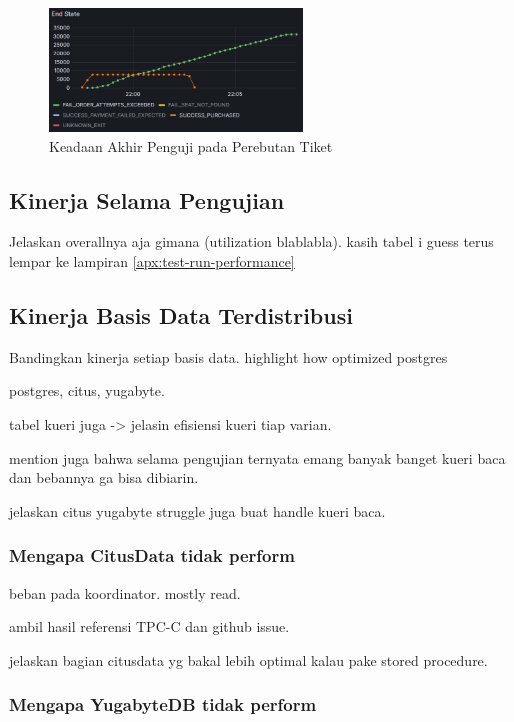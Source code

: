 \begin{figure}[htbp]
    \centering
    \includegraphics[width=0.6\textwidth]{resources/chapter-4/pattern-sim-k6.png}
    \caption{Keadaan Akhir Penguji pada Perebutan Tiket}
    \label{fig:pattern-sim-k6}
\end{figure}


\subsection{Kinerja Selama Pengujian}

Jelaskan overallnya aja gimana (utilization blablabla). kasih tabel i guess terus lempar ke lampiran \ref{apx:test-run-performance}

\subsection{Kinerja Basis Data Terdistribusi}

Bandingkan kinerja setiap basis data. highlight how optimized postgres

postgres, citus, yugabyte.

tabel kueri juga -> jelasin efisiensi kueri tiap varian.

mention juga bahwa selama pengujian ternyata emang banyak banget kueri baca dan bebannya ga bisa dibiarin.

jelaskan citus yugabyte struggle juga buat handle kueri baca.

\subsubsection{Mengapa CitusData tidak perform}

beban pada koordinator. mostly read.

ambil hasil referensi TPC-C dan github issue.

jelaskan bagian citusdata yg bakal lebih optimal kalau pake stored procedure.

\subsubsection{Mengapa YugabyteDB tidak perform}

